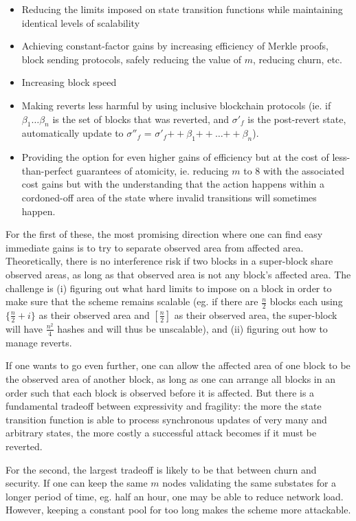 \documentclass[11pt,a4paper]{report}
\theoremstyle{plain}
\theoremstyle{definition}
\theoremstyle{remark}
\begin{document}
\begin{itemize}
\item
Reducing the limits imposed on state transition functions while maintaining identical levels of scalability
\item
Achieving constant-factor gains by increasing efficiency of Merkle proofs, block sending protocols, safely reducing the value of $m$, reducing churn, etc.
\item
Increasing block speed
\item
Making reverts less harmful by using inclusive blockchain protocols (ie. if $\beta_1 \ldots \beta_n$ is the set of blocks that was reverted, and $\sigma'_f$ is the post-revert state, automatically update to $\sigma''_f$ = $\sigma'_f {++} \beta_1 {++} \ldots {++} \beta_n$).
\item
Providing the option for even higher gains of efficiency but at the cost of less-than-perfect guarantees of atomicity, ie. reducing $m$ to $8$ with the associated cost gains but with the understanding that the action happens within a cordoned-off area of the state where invalid transitions will sometimes happen.
\end{itemize}

For the first of these, the most promising direction where one can find easy immediate gains is to try to separate observed area from affected area. Theoretically, there is no interference risk if two blocks in a super-block share observed areas, as long as that observed area is not any block's affected area. The challenge is (i) figuring out what hard limits to impose on a block in order to make sure that the scheme remains scalable (eg. if there are $\frac{n}{2}$ blocks each using $\{\frac{n}{2}+i\}$ as their observed area and $[\frac{n}{2}]$ as their observed area, the super-block will have $\frac{n^2}{4}$ hashes and will thus be unscalable), and (ii) figuring out how to manage reverts.

If one wants to go even further, one can allow the affected area of one block to be the observed area of another block, as long as one can arrange all blocks in an order such that each block is observed before it is affected. But there is a fundamental tradeoff between expressivity and fragility: the more the state transition function is able to process synchronous updates of very many and arbitrary states, the more costly a successful attack becomes if it must be reverted.

For the second, the largest tradeoff is likely to be that between churn and security. If one can keep the same $m$ nodes validating the same substates for a longer period of time, eg. half an hour, one may be able to reduce network load. However, keeping a constant pool for too long makes the scheme more attackable.
\end{document}

